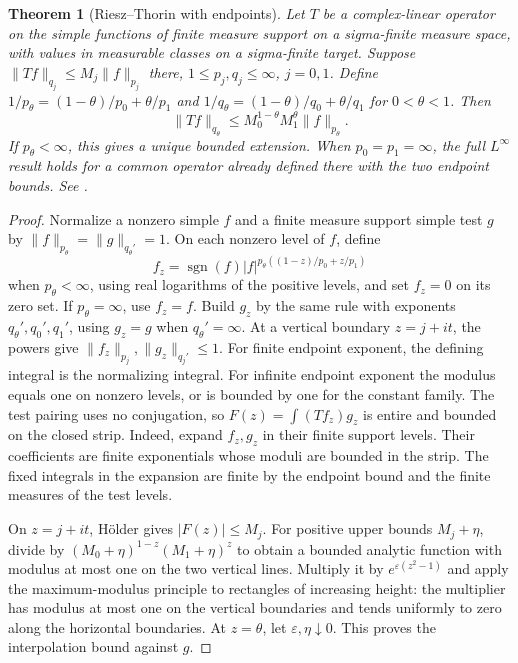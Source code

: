 \documentclass[11pt,oneside,openany]{book}
\newtheorem{theorem}{Theorem}[chapter]
\theoremstyle{definition}
\theoremstyle{remark}
\begin{document}
\begin{theorem}[Riesz--Thorin with endpoints]
\label{p102:AN-06-C04-R01}
Let \(T\) be a complex-linear operator on the simple functions of finite measure support on a sigma-finite measure space, with values in measurable classes on a sigma-finite target. Suppose \(\|Tf\|_{q_j}\le M_j\|f\|_{p_j}\) there, \(1\le p_j,q_j\le\infty\), \(j=0,1\). Define \(1/p_\theta=(1-\theta)/p_0+\theta/p_1\) and \(1/q_\theta=(1-\theta)/q_0+\theta/q_1\) for \(0<\theta<1\). Then
\[
 \|Tf\|_{q_\theta}\le M_0^{1-\theta}M_1^\theta\|f\|_{p_\theta}.
\]
If \(p_\theta<\infty\), this gives a unique bounded extension. When \(p_0=p_1=\infty\), the full \(L^\infty\) result holds for a common operator already defined there with the two endpoint bounds. See \cite[\S1.3.2]{grafakos}.
\end{theorem}
\begin{proof}
Normalize a nonzero simple \(f\) and a finite measure support simple test \(g\) by \(\|f\|_{p_\theta}=\|g\|_{q_\theta'}=1\). On each nonzero level of \(f\), define
\[
 f_z=\operatorname{sgn}(f)|f|^{p_\theta((1-z)/p_0+z/p_1)}
\]
when \(p_\theta<\infty\), using real logarithms of the positive levels, and set \(f_z=0\) on its zero set. If \(p_\theta=\infty\), use \(f_z=f\). Build \(g_z\) by the same rule with exponents \(q_\theta',q_0',q_1'\), using \(g_z=g\) when \(q_\theta'=\infty\). At a vertical boundary \(z=j+it\), the powers give \(\|f_z\|_{p_j},\|g_z\|_{q_j'}\le1\). For finite endpoint exponent, the defining integral is the normalizing integral. For infinite endpoint exponent the modulus equals one on nonzero levels, or is bounded by one for the constant family. The test pairing uses no conjugation, so \(F(z)=\int(Tf_z)g_z\) is entire and bounded on the closed strip. Indeed, expand \(f_z,g_z\) in their finite support levels. Their coefficients are finite exponentials whose moduli are bounded in the strip. The fixed integrals in the expansion are finite by the endpoint bound and the finite measures of the test levels.

On \(z=j+it\), Hölder gives \(|F(z)|\le M_j\). For positive upper bounds \(M_j+\eta\), divide by \((M_0+\eta)^{1-z}(M_1+\eta)^z\) to obtain a bounded analytic function with modulus at most one on the two vertical lines. Multiply it by \(e^{\varepsilon(z^2-1)}\) and apply the maximum-modulus principle to rectangles of increasing height: the multiplier has modulus at most one on the vertical boundaries and tends uniformly to zero along the horizontal boundaries. At \(z=\theta\), let \(\varepsilon,\eta\downarrow0\). This proves the interpolation bound against \(g\).


\end{proof}
\end{document}
